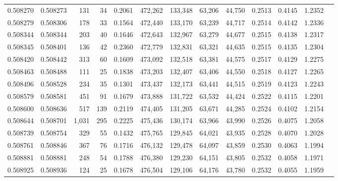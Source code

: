 \begin{tabular}{rrrrrrrrrrrrr}
0.508270 & 0.508273 &   131 &    34 &                                     0.2061 & 472,262 & 133,348 &  63,206 &  44,750 & 0.2513 & 0.4145 & 1.2352 \\
0.508279 & 0.508306 &   178 &    33 &                                     0.1564 & 472,440 & 133,170 &  63,239 &  44,717 & 0.2514 & 0.4142 & 1.2336 \\
0.508344 & 0.508344 &   203 &    40 &                                     0.1646 & 472,643 & 132,967 &  63,279 &  44,677 & 0.2515 & 0.4138 & 1.2317 \\
0.508345 & 0.508401 &   136 &    42 &                                     0.2360 & 472,779 & 132,831 &  63,321 &  44,635 & 0.2515 & 0.4135 & 1.2304 \\
0.508420 & 0.508442 &   313 &    60 &                                     0.1609 & 473,092 & 132,518 &  63,381 &  44,575 & 0.2517 & 0.4129 & 1.2275 \\
0.508463 & 0.508488 &   111 &    25 &                                     0.1838 & 473,203 & 132,407 &  63,406 &  44,550 & 0.2518 & 0.4127 & 1.2265 \\
0.508496 & 0.508528 &   234 &    35 &                                     0.1301 & 473,437 & 132,173 &  63,441 &  44,515 & 0.2519 & 0.4123 & 1.2243 \\
0.508579 & 0.508581 &   451 &    91 &                                     0.1679 & 473,888 & 131,722 &  63,532 &  44,424 & 0.2522 & 0.4115 & 1.2201 \\
0.508600 & 0.508636 &   517 &   139 &                                     0.2119 & 474,405 & 131,205 &  63,671 &  44,285 & 0.2524 & 0.4102 & 1.2154 \\
0.508644 & 0.508701 & 1,031 &   295 &                                     0.2225 & 475,436 & 130,174 &  63,966 &  43,990 & 0.2526 & 0.4075 & 1.2058 \\
0.508739 & 0.508754 &   329 &    55 &                                     0.1432 & 475,765 & 129,845 &  64,021 &  43,935 & 0.2528 & 0.4070 & 1.2028 \\
0.508761 & 0.508846 &   367 &    76 &                                     0.1716 & 476,132 & 129,478 &  64,097 &  43,859 & 0.2530 & 0.4063 & 1.1994 \\
0.508881 & 0.508881 &   248 &    54 &                                     0.1788 & 476,380 & 129,230 &  64,151 &  43,805 & 0.2532 & 0.4058 & 1.1971 \\
0.508925 & 0.508936 &   124 &    25 &                                     0.1678 & 476,504 & 129,106 &  64,176 &  43,780 & 0.2532 & 0.4055 & 1.1959 \\

\end{tabular}
